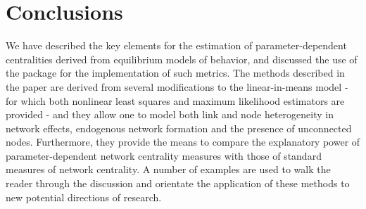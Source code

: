 \documentclass[nojss]{jss}
\begin{document}
\section{Conclusions}\label{sec:conclusion}

We have described the key elements for the estimation of parameter-dependent centralities derived from equilibrium models of behavior, and discussed the use of the package  for the implementation of such metrics. The methods described in the paper are derived from several modifications to the linear-in-means model - for which both nonlinear least squares
and maximum likelihood estimators are provided - and they allow one to model both link and node heterogeneity in network effects, endogenous network formation and the presence of unconnected nodes. Furthermore, they provide the means to compare the explanatory power of parameter-dependent network centrality measures with those of standard measures of network
centrality. A number of examples are used to walk the reader through the discussion and orientate the application of these methods to new potential directions of research.


\end{document}
